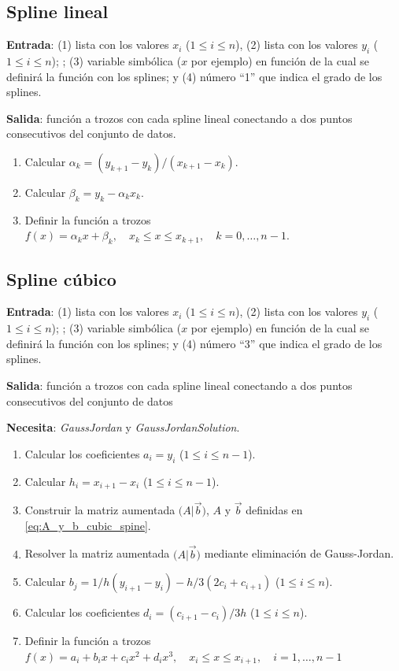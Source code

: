 \documentclass[11pt,letterpaper]{article}
\begin{document}
\subsection{Spline lineal}
\textbf{Entrada}: (1) lista con los valores $x_i$ ($1\leq i\leq n$), (2)
lista con los valores $y_i$ ($1\leq i\leq n$); ; (3) variable
simbólica ($x$ por ejemplo) en función de la cual se definirá la función 
con los splines; y (4) número ``1'' que indica el grado de los
splines.

\textbf{Salida}: función a trozos con cada spline lineal conectando a dos puntos
consecutivos del conjunto de datos.

\begin{enumerate}
\item Calcular $\alpha_k=(y_{k+1}-y_k)/(x_{k+1}-x_k)$.
\item Calcular $\beta_k=y_k-\alpha_k x_k$.
\item Definir la función a trozos $f(x)=\alpha_k x+\beta_k,\quad x_k\leq x\leq x_{k+1},
\quad k=0,\ldots,n-1$.
\end{enumerate}

\subsection{Spline cúbico}
\textbf{Entrada}: (1) lista con los valores $x_i$ ($1\leq i\leq n$), (2)
lista con los valores $y_i$ ($1\leq i\leq n$); ; (3) variable
simbólica ($x$ por ejemplo) en función de la cual se definirá la función 
con los splines; y (4) número ``3'' que indica el grado de los
splines.

\textbf{Salida}: función a trozos con cada spline lineal conectando a dos puntos
consecutivos del conjunto de datos

\textbf{Necesita}: \textit{GaussJordan} y \textit{GaussJordanSolution}.

\begin{enumerate}
\item Calcular los coeficientes $a_i=y_i$ ($1\leq i\leq n-1$).
\item Calcular $h_i=x_{i+1}-x_i$ ($1\leq i\leq n-1$).
\item Construir la matriz aumentada $\big( A\big|\vec b\big)$, $A$ y
$\vec b$ definidas en \eqref{eq:A_y_b_cubic_spine}.
\item Resolver la matriz aumentada  $\big( A\big|\vec b\big)$ 
mediante eliminación de Gauss-Jordan.
\item Calcular $b_j=1/h(y_{i+1}-y_i)-h/3(2c_i+c_{i+1})$ ($1\leq i\leq n$).
\item Calcular los coeficientes $d_i=(c_{i+1}-c_i)/3h$ ($1\leq i\leq n$).
\item Definir la función a trozos 
$f(x)=a_i+b_ix+c_ix^2+d_ix^3,
\quad x_i\leq x\leq x_{i+1},
\quad i=1,\ldots,n-1$
\end{enumerate}
\end{document}
